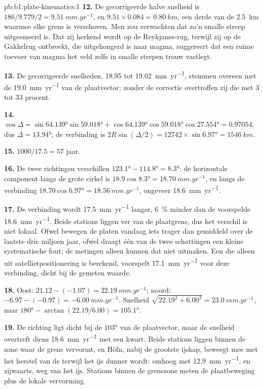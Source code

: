 \begin{solution}{pb:b1:plate-kinematics:1}
\textbf{12.} De gecorrigeerde halve snelheid is $186/9.779/2 = \qty{9.51}{mm.yr^{-1}}$,
en $9.51\times0.084 = \qty{0.80}{km}$, een derde van de \qty{2.5}{km} waarmee elke grens is verschoven. Men zou verwachten dat zo'n smalle streep uitgesmeerd is. Dat zij herkend wordt op de Reykjanes-rug, terwijl zij op de Gakkelrug ontbreekt, die uitgehongerd is naar magma, suggereert dat een ruime toevoer van magma het veld zelfs in smalle strepen trouw vastlegt.

\textbf{13.} De gecorrigeerde snelheden, 18.95 tot \qty{19.02}{mm.yr^{-1}}, stemmen overeen met de \qty{19.0}{mm.yr^{-1}} van de plaatvector; zonder de correctie overtroffen zij die met 3 tot 33 procent.

\textbf{14.} $\cos\Delta = \sin\ang{64.139}\sin\ang{59.018} +
\cos\ang{64.139}\cos\ang{59.018}\cos\ang{27.554} = 0.97054$, dus $\Delta =
\ang{13.94}$; de verbinding is $2R\sin(\Delta/2) = 12742\times\sin\ang{6.97} =
\qty{1546}{km}$.

\textbf{15.} $1000/17.5 = 57$ jaar.

\textbf{16.} De twee richtingen verschillen $\ang{123.1} - \ang{114.8} =
\ang{8.3}$: de horizontale component langs de grote cirkel is
$18.9\cos\ang{8.3} = \qty{18.70}{mm.yr^{-1}}$, en langs de verbinding
$18.70\cos\ang{6.97} = \qty{18.56}{mm.yr^{-1}}$, ongeveer \qty{18.6}{mm.yr^{-1}}.

\textbf{17.} De verbinding wordt \qty{17.5}{mm.yr^{-1}} langer, \qty{6}{\percent} minder dan de voorspelde \qty{18.6}{mm.yr^{-1}}. Beide stations liggen ver van de plaatgrens, dus het verschil is niet lokaal. Ofwel bewegen de platen vandaag iets trager dan gemiddeld over de laatste drie miljoen jaar, ofwel draagt één van de twee schattingen een kleine systematische fout; de metingen alleen kunnen dat niet uitmaken. Een  die alleen uit satellietpositionering is berekend, voorspelt \qty{17.1}{mm.yr^{-1}} voor deze verbinding, dicht bij de gemeten waarde.

\textbf{18.} Oost: $21.12 - (-1.07) = \qty{22.19}{mm.yr^{-1}}$; noord:
$-6.97 - (-0.97) = \qty{-6.00}{mm.yr^{-1}}$. Snelheid $\sqrt{22.19^2 + 6.00^2} =
\qty{23.0}{mm.yr^{-1}}$, naar $\ang{180} - \arctan(22.19/6.00) =
\ang{105.1}$.

\textbf{19.} De richting ligt dicht bij de \ang{103} van de plaatvector, maar de snelheid overtreft diens \qty{18.6}{mm.yr^{-1}} met een kwart. Beide stations liggen binnen de zone waar de grens vervormt, en Höfn, nabij de grootste ijskap, beweegt mee met het herstel van de  terwijl het ijs dunner wordt: omhoog met \qty{12.9}{mm.yr^{-1}}, en zijwaarts, weg van het ijs. Stations binnen de grenszone meten de plaatbeweging plus de lokale vervorming.


\end{solution}
